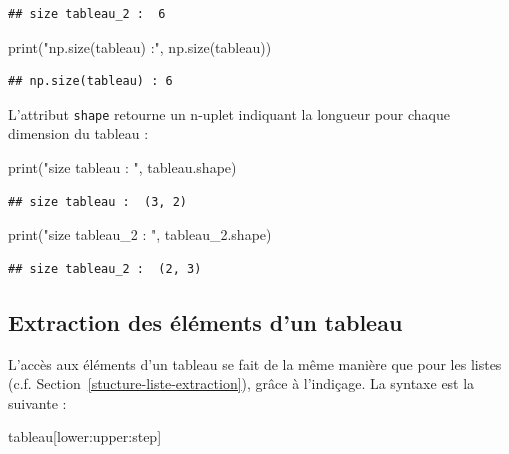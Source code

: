 \documentclass[12pt,]{book}
\newenvironment{Shaded}{\begin{snugshade}}{\end{snugshade}}
\newcommand{\StringTok}[1]{\textcolor[rgb]{0.31,0.60,0.02}{#1}}
\newcommand{\BuiltInTok}[1]{#1}
\newcommand{\NormalTok}[1]{#1}
\numberwithin{equation}{section}
\numberwithin{countremarque}{section}
\begin{document}
\begin{lstlisting}
## size tableau_2 :  6
\end{lstlisting}

\begin{Shaded}
\begin{Highlighting}[]
\BuiltInTok{print}\NormalTok{(}\StringTok{"np.size(tableau) :"}\NormalTok{, np.size(tableau))}
\end{Highlighting}
\end{Shaded}

\begin{lstlisting}
## np.size(tableau) : 6
\end{lstlisting}

L'attribut \texttt{shape} retourne un n-uplet indiquant la longueur pour
chaque dimension du tableau :

\begin{Shaded}
\begin{Highlighting}[]
\BuiltInTok{print}\NormalTok{(}\StringTok{"size tableau : "}\NormalTok{, tableau.shape)}
\end{Highlighting}
\end{Shaded}

\begin{lstlisting}
## size tableau :  (3, 2)
\end{lstlisting}

\begin{Shaded}
\begin{Highlighting}[]
\BuiltInTok{print}\NormalTok{(}\StringTok{"size tableau_2 : "}\NormalTok{, tableau_2.shape)}
\end{Highlighting}
\end{Shaded}

\begin{lstlisting}
## size tableau_2 :  (2, 3)
\end{lstlisting}

\subsection{Extraction des éléments d'un
tableau}\label{extraction-des-elements-dun-tableau}

L'accès aux éléments d'un tableau se fait de la même manière que pour
les listes (c.f. Section~\ref{stucture-liste-extraction}), grâce à
l'indiçage. La syntaxe est la suivante :

\begin{Shaded}
\begin{Highlighting}[]
\NormalTok{tableau[lower:upper:step]}
\end{Highlighting}
\end{Shaded}
\end{document}
